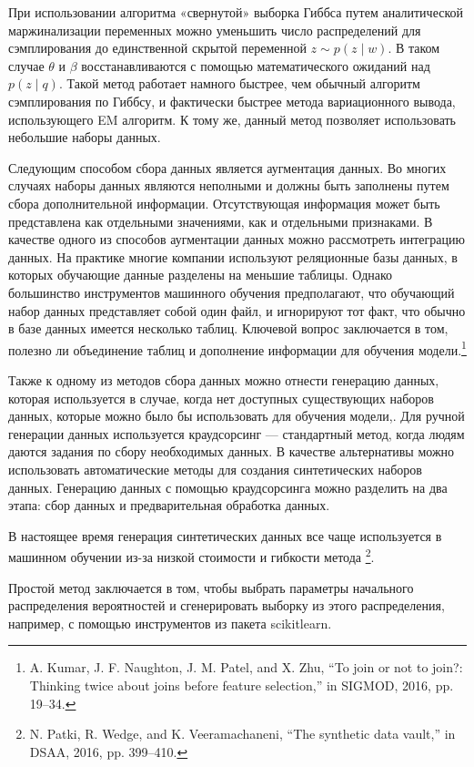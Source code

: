 \documentclass[12pt,a4paper, oneside]{extreport}
\begin{document}
При использовании алгоритма «свернутой» выборка Гиббса путем аналитической маржинализации переменных можно  уменьшить  число распределений для сэмплирования  до единственной скрытой переменной 
$z \sim p(z \mid w)$. 
В таком случае $\theta$ и $\beta$  восстанавливаются с помощью  математического ожиданий над $p(z \mid q)$. 
Такой метод работает намного быстрее, чем обычный алгоритм сэмплирования  по Гиббсу, и фактически быстрее  метода вариационного вывода, использующего EM алгоритм. К тому же, данный метод позволяет использовать небольшие наборы данных.

Следующим способом сбора данных является аугментация данных. Во многих случаях наборы данных являются неполными и должны быть заполнены путем сбора дополнительной информации. Отсутствующая информация может быть представлена как отдельными значениями, как и отдельными признаками. В качестве одного из способов аугментации данных можно рассмотреть интеграцию  данных.
На практике многие компании используют реляционные базы данных, в которых обучающие данные разделены на меньшие таблицы. Однако большинство инструментов машинного обучения предполагают, что обучающий набор данных представляет собой один файл, и игнорируют тот факт, что обычно в базе данных имеется несколько таблиц.
Ключевой вопрос заключается в том, полезно ли объединение таблиц и дополнение информации для обучения модели.\footnote{A. Kumar, J. F. Naughton, J. M. Patel, and X. Zhu, “To join or not 	to join?: Thinking twice about joins before feature selection,” in 	SIGMOD, 2016, pp. 19–34.} 

Также к одному из методов сбора данных можно отнести генерацию  данных, которая используется в случае, когда нет доступных существующих наборов данных, которые можно было бы использовать для обучения модели,. Для ручной генерации данных используется краудсорсинг — стандартный метод, когда людям даются задания по сбору необходимых данных. В качестве альтернативы можно использовать автоматические методы для создания синтетических наборов данных. 
Генерацию данных с помощью краудсорсинга можно разделить на два этапа: сбор данных и предварительная обработка данных. 


В настоящее время генерация синтетических данных все чаще используется в машинном обучении из-за низкой стоимости и гибкости  метода \footnote{N. Patki, R. Wedge, and K. Veeramachaneni, “The synthetic data 	vault,” in DSAA, 2016, pp. 399–410.}. 

Простой метод заключается в том, чтобы выбрать параметры  начального распределения вероятностей и сгенерировать выборку из этого распределения, например,  с помощью  инструментов из пакета scikitlearn. 
\end{document}
